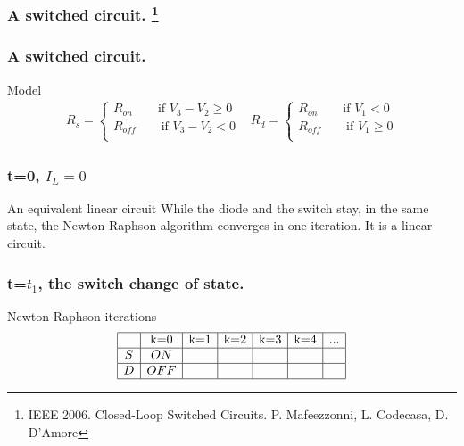 
\frame
{

\frametitle{A switched circuit. \footnote{IEEE 2006. Closed-Loop Switched Circuits. P. Mafeezzonni, L. Codecasa, D. D'Amore}}
  \begin{figure}[!h]
   \centerline{
   \scalebox{0.9}{
    
    }
 } 
 \end{figure}



 
}

\frame
{

\frametitle{A switched circuit.}
  \begin{figure}[!h]
   \centerline{
   \scalebox{0.9}{
    
    }
 } 
 \end{figure}
\begin{block}{Model}
\begin{equation}
\begin{array}{cc}
R_s= \begin{cases}
R_{on} \qquad \text{if $V_3-V_2 \geq 0$}\\
R_{off} \qquad \text{if $V_3-V_2 < 0$}\\
\end{cases}&
R_d= \begin{cases}
R_{on} \qquad \text{if $V_1 < 0$}\\
R_{off} \qquad \text{if $V_1 \geq 0$}\\
\end{cases}
\end{array}
\end{equation}
\end{block}

 }

 \frame
{

\frametitle{t=0, $I_L=0$}
  \begin{figure}[!h]
   \centerline{
   \scalebox{0.9}{
    
    }
 } 
 \end{figure}
\begin{block}{An equivalent linear circuit}
While the diode and the switch stay, in the same state, the Newton-Raphson algorithm converges in
one iteration. It is a linear circuit.
\end{block}


 }

 \frame
{

\frametitle{t=$t_1$, the switch change of state.}

  \begin{figure}[!h]
   \centerline{
   \scalebox{0.9}{
    
    }
 } 
 \end{figure}

 \begin{block}{Newton-Raphson iterations}
\begin{equation}
\begin{array}{|c|c|c|c|c|c|c|}
\hline
&$k=0$&$k=1$&$k=2$&$k=3$&$k=4$&...\\
\hline
S&ON&&&&&\\
\hline
D&OFF&&&&&\\
\hline
\end{array}
\end{equation}
\end{block}


 }

